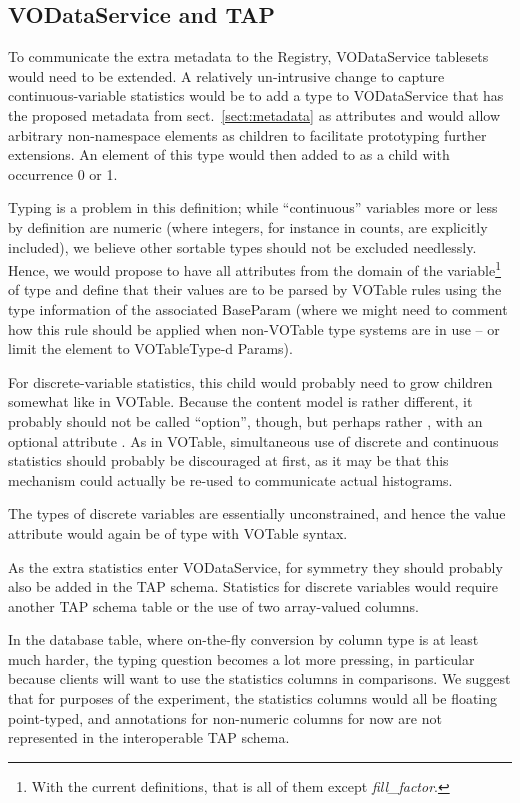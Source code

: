 \documentclass[11pt,a4paper]{ivoa}
\begin{document}
\subsection{VODataService and TAP}

To communicate the extra metadata to the Registry, VODataService
tablesets would need to be extended.  A relatively un-intrusive change
to capture continuous-variable statistics would be to add a type
 to VODataService that has the proposed metadata from
sect.~\ref{sect:metadata} as attributes and would allow arbitrary
non-namespace elements as children to facilitate prototyping further
extensions.  An element of this type would then added to
 as a  child with occurrence 0 or 1.

Typing is a problem in this definition; while ``continuous'' variables
more or less by definition are numeric (where integers, for instance in
counts, are explicitly included), we believe other sortable types should
not be excluded needlessly.  Hence, we would propose to have all
attributes from the domain of the variable\footnote{With the current
definitions, that is all of them except \emph{fill\_factor}.} of type
  and define that their values are to be parsed by
VOTable rules using the type information of the associated BaseParam
(where we might need to comment how this rule should be applied when
non-VOTable type systems are in use -- or limit the element to
VOTableType-d Params).

For discrete-variable statistics, this  child would
probably need to grow children somewhat like  in VOTable.
Because the content model is rather different, it probably should not be
called ``option'', though, but perhaps rather , with an
optional attribute .  As in VOTable, simultaneous use of
discrete and continuous statistics should probably be discouraged at
first, as it may be that this mechanism could actually be re-used to
communicate actual histograms.

The types of discrete variables are essentially unconstrained, and hence
the value attribute would again be of type  with VOTable
syntax.

As the extra statistics enter VODataService, for symmetry they should
probably also be added in the TAP schema.  Statistics for discrete
variables would require another TAP schema table or the use of two
array-valued columns.

In the database table, where on-the-fly conversion by column type is at
least much harder, the typing question becomes a lot more pressing, in
particular because clients will want to use the statistics columns in
comparisons.  We
suggest that for purposes of the experiment, the statistics columns
would all be floating point-typed, and annotations for non-numeric
columns for now are not represented in the interoperable TAP schema.
\end{document}
